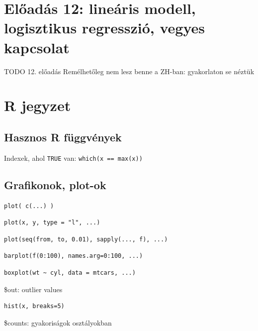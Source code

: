 \documentclass[12pt,a4paper]{article}
\begin{document}
\pagebreak

\section{Előadás 12: lineáris modell, logisztikus regresszió, vegyes kapcsolat}

\begin{outline}
	\1 TODO 12. előadás
	\1 Remélhetőleg nem lesz benne a ZH-ban: gyakorlaton se néztük
\end{outline}

\pagebreak


\section{R jegyzet}

\subsection{Hasznos R függvények}

\begin{outline}
	\1 Indexek, ahol \texttt{TRUE} van: \texttt{which(x == max(x))}
\end{outline}

\subsection{Grafikonok, plot-ok}

\begin{outline}
	\1 \begin{verbatim}plot( c(...) )\end{verbatim}
	\1 \begin{verbatim}plot(x, y, type = "l", ...)\end{verbatim}
	\1 \begin{verbatim}plot(seq(from, to, 0.01), sapply(..., f), ...)\end{verbatim}
	\1 \begin{verbatim}barplot(f(0:100), names.arg=0:100, ...)\end{verbatim}
	\1 \begin{verbatim}boxplot(wt ~ cyl, data = mtcars, ...)\end{verbatim}
		\2 \$out: outlier values
	\1 \begin{verbatim}hist(x, breaks=5)\end{verbatim}
		\2 \$counts: gyakoriságok osztályokban
\end{outline}
\end{document}
